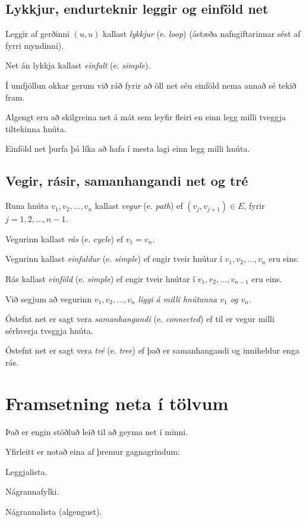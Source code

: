 \subsection{Lykkjur, endurteknir leggir og einföld net}
{
	{
		\item<1-> Leggir af gerðinni $(u, u)$ kallast \emph{lykkjur} (e. \emph{loop}) (ástæða nafngiftarinnar sést af fyrri myndinni).
		\item<2-> Net án lykkja kallast \emph{einfalt} (e. \emph{simple}).
		\item<3-> Í umfjöllun okkar gerum við ráð fyrir að öll net séu einföld nema annað sé tekið fram.
		\item<4-> Algengt eru að skilgreina net á mát sem leyfir fleiri en einn legg milli tveggja tiltekinna hnúta.
		\item<5-> Einföld net þurfa þá líka að hafa í mesta lagi einn legg milli hnúta.
	}
}

\subsection{Vegir, rásir, samanhangandi net og tré}
{
	{
		\item<1-> Runa hnúta $v_1, v_2, ..., v_n$ kallast \emph{vegur} (e. \emph{path}) ef $(v_j, v_{j + 1}) \in E$, fyrir $j = 1, 2, ..., n - 1$.
		\item<2-> Vegurinn kallast \emph{rás} (e. \emph{cycle}) ef $v_1 = v_n$.
		\item<3-> Vegurinn kallast \emph{einfaldur} (e. \emph{simple}) ef engir tveir hnútar í $v_1, v_2, ..., v_n$ eru eins.
		\item<4-> Rás kallast \emph{einföld} (e. \emph{simple}) ef engir tveir hnútar í $v_1, v_2, ..., v_{n - 1}$ eru eins.
		\item<5-> Við segjum að vegurinn $v_1, v_2, ..., v_n$ \emph{liggi á milli hnútanna $v_1$ og $v_n$}.
		\item<6-> Óstefnt net er sagt vera \emph{samanhangandi} (e. \emph{connected}) ef til er vegur milli sérhverja tveggja hnúta.
		\item<7-> Óstefnt net er sagt vera \emph{tré} (e. \emph{tree}) ef það er samanhangandi og inniheldur enga rás.
	}
}

\section{Framsetning neta í tölvum}
{
	{
		\item<1-> Það er engin stöðluð leið til að geyma net í minni.
		\item<2-> Yfirleitt er notað eina af þremur gagnagrindum:
		{
			\item<3-> Leggjalista.
			\item<4-> Nágrannafylki.
			\item<5-> Nágrannalista (algengust).
		}
	}
}

